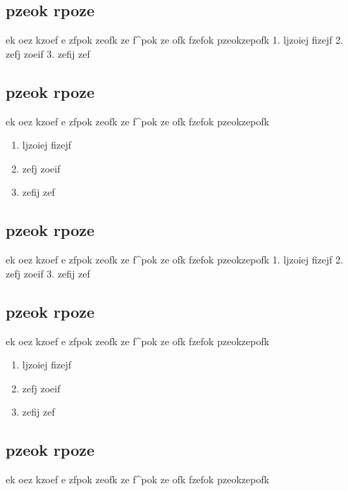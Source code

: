 \documentclass[
]{book}
\providecommand{\tightlist}{%
  \setlength{\itemsep}{0pt}\setlength{\parskip}{0pt}}
\def\tightlist{}
\begin{document}
\begin{blackbox}
\hypertarget{pzeok-rpoze-11}{%
\subsection{pzeok rpoze}\label{pzeok-rpoze-11}}

ek oez kzoef
e zfpok zeofk
ze f\^{}pok ze ofk
fzefok pzeokzepofk
1. ljzoiej fizejf
2. zefj zoeif
3. zefij zef

\hypertarget{pzeok-rpoze-12}{%
\subsection{pzeok rpoze}\label{pzeok-rpoze-12}}

ek oez kzoef
e zfpok zeofk
ze f\^{}pok ze ofk
fzefok pzeokzepofk

\begin{enumerate}
\def\labelenumi{\arabic{enumi}.}
\tightlist
\item
  ljzoiej fizejf
\item
  zefj zoeif
\item
  zefij zef
\end{enumerate}

\hypertarget{pzeok-rpoze-13}{%
\subsection{pzeok rpoze}\label{pzeok-rpoze-13}}

ek oez kzoef
e zfpok zeofk
ze f\^{}pok ze ofk
fzefok pzeokzepofk
1. ljzoiej fizejf
2. zefj zoeif
3. zefij zef

\hypertarget{pzeok-rpoze-14}{%
\subsection{pzeok rpoze}\label{pzeok-rpoze-14}}

ek oez kzoef
e zfpok zeofk
ze f\^{}pok ze ofk
fzefok pzeokzepofk

\begin{enumerate}
\def\labelenumi{\arabic{enumi}.}
\tightlist
\item
  ljzoiej fizejf
\item
  zefj zoeif
\item
  zefij zef
\end{enumerate}

\hypertarget{pzeok-rpoze-15}{%
\subsection{pzeok rpoze}\label{pzeok-rpoze-15}}

ek oez kzoef
e zfpok zeofk
ze f\^{}pok ze ofk
fzefok pzeokzepofk

\end{blackbox}
\end{document}
